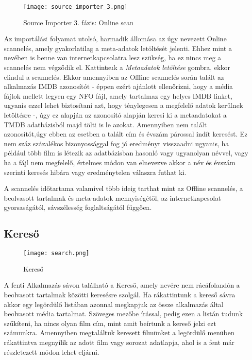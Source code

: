\begin{figure}[H]
	\centering
	\texttt{[image: source\_importer\_3.png]}
	\caption{Source Importer 3. fázis: Online scan}
	\label{fig:source_importer_3}
\end{figure}
Az importálási folyamat utolsó, harmadik állomása az úgy nevezett Online scannelés, amely gyakorlatilag a meta-adatok letöltését jelenti. Ehhez mint a nevében is benne van internetkapcsolatra lesz szükség, ha ez nincs meg a scannelés nem végződik el. Kattintsuk a {\it Metaadatok letöltése} gombra, ekkor elindul a scannelés.
Ekkor amennyiben az Offline scannelés során talált az alkalmazás IMDB azonosítót - éppen ezért ajánlott ellenőrizni, hogy a média fájlok mellett legyen egy NFO fájl, amely tartalmaz egy helyes IMDB linket, ugyanis ezzel lehet biztosítani azt, hogy ténylegesen a megfelelő adatok kerülnek letöltésre -, úgy ez alapján az azonosító alapján keresi ki a metaadatokat a TMDB adatbázisból majd tölti is le azokat. Amennyiben nem talált azonosítót,úgy ebben az esetben a talált cím és évszám párossal indít keresést. Ez nem száz százalékos bizonyossággal fog jó eredményt visszaadni ugyanis, ha például több film is létezik az adatbázisban hasonló vagy ugyanolyan névvel, vagy ha a fájl nem megfelelő, értelmes módon van elnevezve akkor a név és évszám szerinti keresés hibára vagy eredménytelen válaszra futhat ki.

A scannelés időtartama valamivel több ideig tarthat mint az Offline scannelés, a beolvasott tartalmak és meta-adatok mennyiségétől, az internetkapcsolat gyorsaságától, sávszélesség foglaltságától függően.

\subsection{Kereső}
\begin{figure}[H]
	\centering
	\texttt{[image: search.png]}
	\caption{Kereső}
	\label{fig:search}
\end{figure}
A fenti Alkalmazás sávon található a Kereső, amely nevére nem rácáfolandón a beolvasott tartalmak közötti keresésre szolgál. Ha rákattintunk a kereső sávra akkor egy legördülő listában azonnal megkapjuk az össze alkalmazás által beolvasott média tartalmat. Szöveges mezőbe írással, pedig ezen a listán tudunk szűkíteni, ha nincs olyan film cím, mint amit beírtunk a kereső jelzi ezt számunkra. Amennyiben megtaláltuk keresett filmünket a legördülő menüben rákattintva megnyílik az adott film vagy sorozat adatlapja, ahol is a fent már részletezett módon lehet eljárni.

